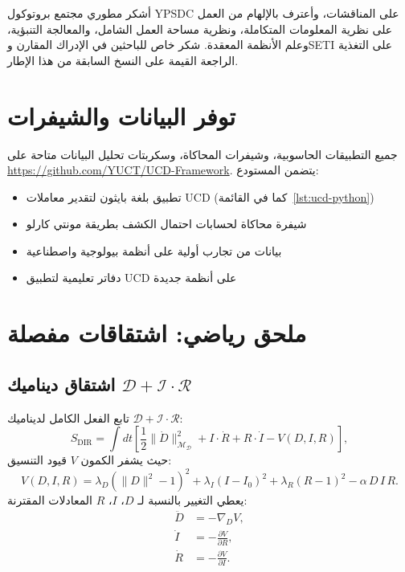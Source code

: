 \documentclass[12pt,a4paper]{article}
\newcommand{\Dict}{\mathcal{D}}
\newcommand{\Mdict}{\mathcal{M}_{\Dict}}
\begin{document}
	أشكر مطوري مجتمع بروتوكول YPSDC على المناقشات، وأعترف بالإلهام من العمل على نظرية المعلومات المتكاملة، ونظرية مساحة العمل الشامل، والمعالجة التنبؤية، وعلم الأنظمة المعقدة. شكر خاص للباحثين في الإدراك المقارن وSETI على التغذية الراجعة القيمة على النسخ السابقة من هذا الإطار.
	
	\section*{توفر البيانات والشيفرات}
	
	جميع التطبيقات الحاسوبية، وشيفرات المحاكاة، وسكربتات تحليل البيانات متاحة على \url{https://github.com/YUCT/UCD-Framework}. يتضمن المستودع:
	\begin{itemize}
		\item تطبيق بلغة بايثون لتقدير معاملات UCD (كما في القائمة~\ref{lst:ucd-python})
		\item شيفرة محاكاة لحسابات احتمال الكشف بطريقة مونتي كارلو
		\item بيانات من تجارب أولية على أنظمة بيولوجية واصطناعية
		\item دفاتر تعليمية لتطبيق UCD على أنظمة جديدة
	\end{itemize}
	
	\appendix
	
	\section{ملحق رياضي: اشتقاقات مفصلة}
	
	\subsection{اشتقاق ديناميك \(\mathcal{D}+\mathcal{I}\cdot\mathcal{R}\)}
	
	تابع الفعل الكامل لديناميك \(\mathcal{D}+\mathcal{I}\cdot\mathcal{R}\):
	\[
	S_{\mathrm{DIR}} = \int dt \left[ \frac{1}{2}\|\dot{D}\|^2_{\Mdict} + I \cdot \dot{R} + R \cdot \dot{I} - V(D,I,R) \right],
	\]
	حيث يشفر الكمون \(V\) قيود التنسيق:
	\[
	V(D,I,R) = \lambda_D (\|D\|^2 - 1)^2 + \lambda_I (I - I_0)^2 + \lambda_R (R - 1)^2 - \alpha\, D\,I\,R.
	\]
	يعطي التغيير بالنسبة لـ \(D\)، \(I\)، \(R\) المعادلات المقترنة:
	\begin{align*}
		\ddot{D} &= -\nabla_D V, \\
		\dot{I}  &= -\frac{\partial V}{\partial R}, \\
		\dot{R}  &= -\frac{\partial V}{\partial I}.
	\end{align*}
	
\end{document}
